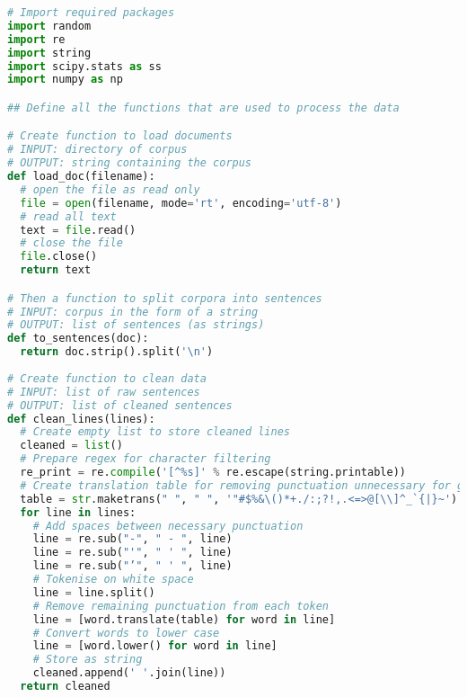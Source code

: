 \documentclass[11pt]{article}
\begin{document}
\begin{lstlisting}[language=Python]
# Import required packages
import random
import re
import string
import scipy.stats as ss
import numpy as np

## Define all the functions that are used to process the data

# Create function to load documents
# INPUT: directory of corpus
# OUTPUT: string containing the corpus
def load_doc(filename):
  # open the file as read only
  file = open(filename, mode='rt', encoding='utf-8')
  # read all text
  text = file.read()
  # close the file
  file.close()
  return text

# Then a function to split corpora into sentences
# INPUT: corpus in the form of a string
# OUTPUT: list of sentences (as strings)
def to_sentences(doc):
  return doc.strip().split('\n')
  
# Create function to clean data
# INPUT: list of raw sentences
# OUTPUT: list of cleaned sentences
def clean_lines(lines):
  # Create empty list to store cleaned lines
  cleaned = list()
  # Prepare regex for character filtering
  re_print = re.compile('[^%s]' % re.escape(string.printable))
  # Create translation table for removing punctuation unnecessary for grammar
  table = str.maketrans(" ", " ", '"#$%&\()*+./:;?!,.<=>@[\\]^_`{|}~')
  for line in lines:
    # Add spaces between necessary punctuation
    line = re.sub("-", " - ", line)
    line = re.sub("'", " ' ", line)
    line = re.sub("’", " ' ", line)
    # Tokenise on white space
    line = line.split()
    # Remove remaining punctuation from each token
    line = [word.translate(table) for word in line]
    # Convert words to lower case
    line = [word.lower() for word in line]
    # Store as string
    cleaned.append(' '.join(line))
  return cleaned
  

\end{lstlisting}
\end{document}
